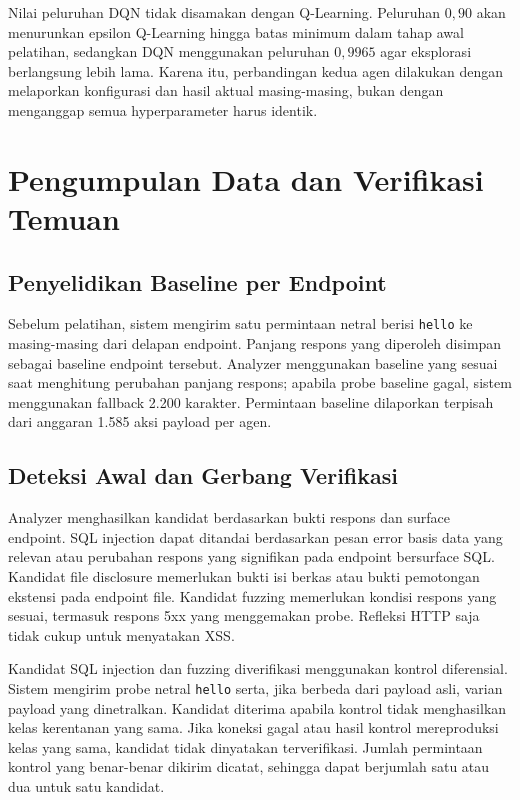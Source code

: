 Nilai peluruhan DQN tidak disamakan dengan Q-Learning. Peluruhan \(0{,}90\) akan menurunkan epsilon Q-Learning hingga batas minimum dalam tahap awal pelatihan, sedangkan DQN menggunakan peluruhan \(0{,}9965\) agar eksplorasi berlangsung lebih lama. Karena itu, perbandingan kedua agen dilakukan dengan melaporkan konfigurasi dan hasil aktual masing-masing, bukan dengan menganggap semua hyperparameter harus identik.

\section{Pengumpulan Data dan Verifikasi Temuan}

\subsection{Penyelidikan Baseline per Endpoint}

Sebelum pelatihan, sistem mengirim satu permintaan netral berisi \texttt{hello} ke masing-masing dari delapan endpoint. Panjang respons yang diperoleh disimpan sebagai baseline endpoint tersebut. Analyzer menggunakan baseline yang sesuai saat menghitung perubahan panjang respons; apabila probe baseline gagal, sistem menggunakan fallback 2.200 karakter. Permintaan baseline dilaporkan terpisah dari anggaran 1.585 aksi payload per agen.

\subsection{Deteksi Awal dan Gerbang Verifikasi}

Analyzer menghasilkan kandidat berdasarkan bukti respons dan surface endpoint. SQL injection dapat ditandai berdasarkan pesan error basis data yang relevan atau perubahan respons yang signifikan pada endpoint bersurface SQL. Kandidat file disclosure memerlukan bukti isi berkas atau bukti pemotongan ekstensi pada endpoint file. Kandidat fuzzing memerlukan kondisi respons yang sesuai, termasuk respons 5xx yang menggemakan probe. Refleksi HTTP saja tidak cukup untuk menyatakan XSS.

Kandidat SQL injection dan fuzzing diverifikasi menggunakan kontrol diferensial. Sistem mengirim probe netral \texttt{hello} serta, jika berbeda dari payload asli, varian payload yang dinetralkan. Kandidat diterima apabila kontrol tidak menghasilkan kelas kerentanan yang sama. Jika koneksi gagal atau hasil kontrol mereproduksi kelas yang sama, kandidat tidak dinyatakan terverifikasi. Jumlah permintaan kontrol yang benar-benar dikirim dicatat, sehingga dapat berjumlah satu atau dua untuk satu kandidat.

